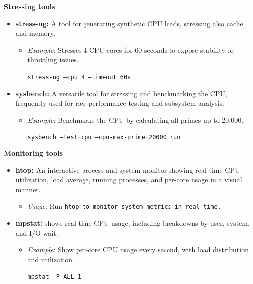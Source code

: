 \begin{exampleblock}

\textbf{Stressing tools}

\begin{itemize}
    \item \textbf{stress-ng:} A tool for generating synthetic CPU loads, stressing also cache and memory.
    \begin{itemize}
        \item \textit{Example}: Stresses 4 CPU cores for 60 seconds to expose stability or throttling issues.

        \begin{center}
        \tt{stress-ng --cpu 4 --timeout 60s}
        \end{center}
    \end{itemize}

    \item \textbf{sysbench:} A versatile tool for stressing and benchmarking the CPU, frequently used for raw performance testing and subsystem analysis.
    \begin{itemize}
        \item \textit{Example}: Benchmarks the CPU by calculating all primes up to 20,000.

        \begin{center}
        \tt{sysbench --test=cpu --cpu-max-prime=20000 run}
        \end{center}
    \end{itemize}
\end{itemize}

\textbf{Monitoring tools}

\begin{itemize}
    \item \textbf{htop:} An interactive process and system monitor showing real-time CPU utilization, load average, running processes, and per-core usage in a visual manner.
    \begin{itemize}
        \item \textit{Usage}: Run \tt{htop} to monitor system metrics in real time.
    \end{itemize}

    \item \textbf{mpstat:} shows real-time CPU usage, including breakdowns by user, system, and I/O wait.
    \begin{itemize}
        \item \textit{Example}: Show per-core CPU usage every second, with load distribution and utilization.

        \begin{center}
        \tt{mpstat -P ALL 1}
        \end{center}
    \end{itemize}
\end{itemize}
\end{exampleblock}

